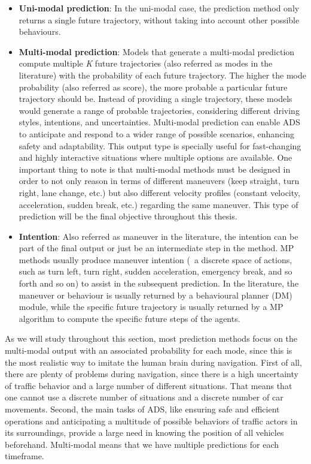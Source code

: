 \begin{itemize}
	
	\item \textbf{Uni-modal prediction}: In the uni-modal case, the prediction method only returns a single future trajectory, without taking into account other possible behaviours. 
	
	\item \textbf{Multi-modal prediction}: Models that generate a multi-modal prediction compute multiple \textit{K} future trajectories (also referred as modes in the literature) with the probability of each future trajectory. The higher the mode probability (also referred as score), the more probable a particular future trajectory should be. Instead of providing a single trajectory, these models would generate a range of probable trajectories, considering different driving styles, intentions, and uncertainties. Multi-modal prediction can enable \ac{ADS} to anticipate and respond to a wider range of possible scenarios, enhancing safety and adaptability. This output type is specially useful for fast-changing and highly interactive situations where multiple options are available. One important thing to note is that multi-modal methods must be designed in order to not only reason in terms of different maneuvers (keep straight, turn right, lane change, etc.) but also different velocity profiles (constant velocity, acceleration, sudden break, etc.) regarding the same maneuver. This type of prediction will be the final objective throughout this thesis.
	
	\item \textbf{Intention}: Also referred as maneuver in the literature, the intention can be part of the final output or just be an intermediate step in the method. \ac{MP} methods usually produce maneuver intention (\ie \ a discrete space of actions, such as turn left, turn right, sudden acceleration, emergency break, and so forth and so on) to assist in the subsequent prediction. In the literature, the maneuver or behaviour is usually returned by a behavioural planner (\ac{DM}) module, while the specific future trajectory is usually returned by a \ac{MP} algorithm to compute the specific future steps of the agents.
\end{itemize}

As we will study throughout this section, most prediction methods focus on the multi-modal output with an associated probability for each mode, since this is the most realistic way to imitate the human brain during navigation. First of all, there are plenty of problems during navigation, since there is a high uncertainty of traffic behavior and a large number of different situations. That means that one cannot use a discrete number of situations and a discrete number of car movements. Second, the main tasks of \ac{ADS}, like ensuring safe and efficient operations and anticipating a multitude of possible behaviors of traffic actors in its surroundings, provide a large need in knowing the position of all vehicles beforehand. Multi-modal means that we have multiple predictions for each timeframe. 

